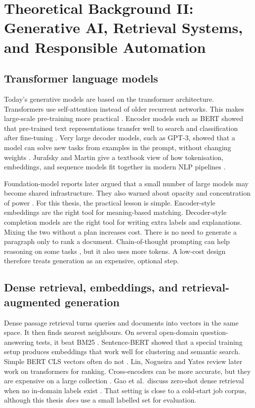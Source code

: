 \chapter{Theoretical Background II: Generative AI, Retrieval Systems, and Responsible Automation}
\label{ch:theory-ai}

\section{Transformer language models}
\label{sec:transformers}

Today's generative models are based on the transformer architecture. Transformers use self-attention instead of older recurrent networks. This makes large-scale pre-training more practical . Encoder models such as BERT showed that pre-trained text representations transfer well to search and classification after fine-tuning . Very large decoder models, such as GPT-3, showed that a model can solve new tasks from examples in the prompt, without changing weights . Jurafsky and Martin give a textbook view of how tokenisation, embeddings, and sequence models fit together in modern NLP pipelines .

Foundation-model reports later argued that a small number of large models may become shared infrastructure. They also warned about opacity and concentration of power . For this thesis, the practical lesson is simple. Encoder-style embeddings are the right tool for meaning-based matching. Decoder-style completion models are the right tool for writing extra labels and explanations. Mixing the two without a plan increases cost. There is no need to generate a paragraph only to rank a document. Chain-of-thought prompting can help reasoning on some tasks , but it also uses more tokens. A low-cost design therefore treats generation as an expensive, optional step.

\section{Dense retrieval, embeddings, and retrieval-augmented generation}
\label{sec:dense}

Dense passage retrieval turns queries and documents into vectors in the same space. It then finds nearest neighbours. On several open-domain question-answering tests, it beat BM25 . Sentence-BERT showed that a special training setup produces embeddings that work well for clustering and semantic search. Simple BERT CLS vectors often do not . Lin, Nogueira and Yates review later work on transformers for ranking. Cross-encoders can be more accurate, but they are expensive on a large collection . Gao et al.\ discuss zero-shot dense retrieval when no in-domain labels exist . That setting is close to a cold-start job corpus, although this thesis \emph{does} use a small labelled set for evaluation.

